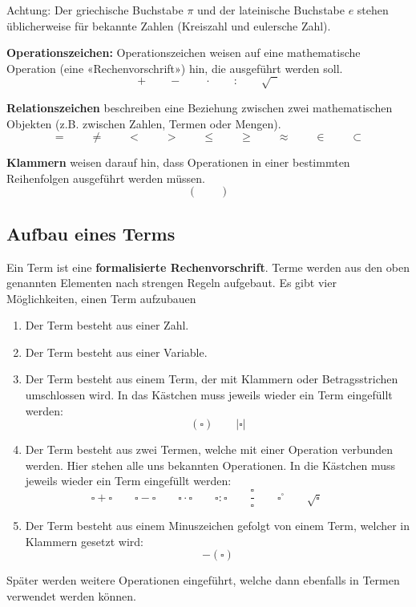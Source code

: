 Achtung: Der griechische Buchstabe $\pi$ und der lateinische Buchstabe $e$ stehen üblicherweise für bekannte Zahlen (Kreiszahl und eulersche Zahl).

\textbf{Operationszeichen:} Operationszeichen weisen auf eine mathematische Operation (eine «Rechenvorschrift») hin, die ausgeführt werden soll.
\[
  + \qquad - \qquad \cdot \qquad : \qquad \sqrt{\phantom{x}}
\]

\textbf{Relationszeichen} beschreiben eine Beziehung zwischen zwei mathematischen Objekten (z.B. zwischen Zahlen, Termen oder Mengen).
\[
  = \qquad \neq \qquad <  \qquad >  \qquad \leq  \qquad \geq  \qquad \approx \qquad \in \qquad \subset
\]

\textbf{Klammern} weisen darauf hin, dass Operationen in einer bestimmten Reihenfolgen ausgeführt werden müssen.
\[
  ( \qquad )
\]

\subsection{Aufbau eines Terms}

Ein Term ist eine \textbf{formalisierte Rechenvorschrift}. Terme werden aus den oben genannten Elementen nach strengen Regeln aufgebaut. Es gibt vier Möglichkeiten, einen Term aufzubauen
\begin{enumerate}
  \item Der Term besteht aus einer Zahl.
  \item Der Term besteht aus einer Variable.
  \item Der Term besteht aus einem Term, der mit Klammern oder Betragsstrichen umschlossen wird. In das Kästchen muss jeweils wieder ein Term eingefüllt werden:
  \[
    ( \square ) \qquad | \square |
  \]
  \item Der Term besteht aus zwei Termen, welche mit einer Operation verbunden werden. Hier stehen alle uns bekannten Operationen. In die Kästchen muss jeweils wieder ein Term eingefüllt werden:
  \[
    \square+\square \qquad
    \square-\square \qquad
    \square\cdot\square \qquad
    \square:\square \qquad
    \frac{\square}{\square} \qquad
    \square^{\square} \qquad
    \sqrt{\square} \qquad
  \]
  \item Der Term besteht aus einem Minuszeichen gefolgt von einem Term, welcher in Klammern gesetzt wird:
  \[
    -(\square)
  \]
\end{enumerate}
Später werden weitere Operationen eingeführt, welche dann ebenfalls in Termen verwendet werden können.


